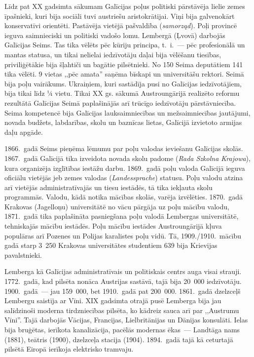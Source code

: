 \documentclass[twoside,a5paper,12pt,fleqn,openany]{extbook}
\newcommand{\pltxti}[1]{\textit{\textpolish{#1}}}
\newcommand{\detxti}[1]{\textit{\textgerman{#1}}}
\begin{document}
Līdz pat XX gadsimta sākumam Galīcijas poļus politiski pārstāvēja lielie zemes īpašnieki, kuri bija sociāli tuvi austriešu aristokrātijai. Viņi bija galvenokārt konservatīvi orientēti. Pastāvēja vietējā pašvaldība (\pltxti{samorząd}). Poļi provincē ieguva saimnieciski un politiski vadošo lomu. Lembergā (Ļvovā) darbojās Galīcijas Seims. Tas tika vēlēts pēc kūriju principa, t.~i.~--- pēc profesionālā un mantas statusa, un tikai nelielai iedzīvotāju daļai bija vēlēšanu tiesības, priviliģētākie bija šļahtiči un bagātie pilsētnieki. No 150 Seima deputātiem 141 tika vēlēti. 9 vietas ,,pēc amata'' saņēma bīskapi un universitāšu rektori. Seimā bija poļu vairākums. Ukraiņiem, kuri sastādīja pusi no Galīcijas iedzīvotājiem, bija tikai līdz ¼ vietu. Tikai XX gs. sākumā Austroungārijā realizēto reformu rezultātā Galīcijas Seimā paplašinājās arī trūcīgo iedzīvotāju pārstāvniecība. Seima kompetencē bija Galīcijas lauksaimniecības un mežsaimniecības jautājumi, novada budžets, labdarības, skolu un baznīcas lietas, Galīcijā izvietoto armijas daļu apgāde.

1866.~gadā Seims pieņēma lēmumu par poļu valodas ieviešanu Galīcijas skolās. 1867.~gadā Galīcijā tika izveidota novada skolu padome (\pltxti{Rada Szkolna Krajowa}), kura organizēja izglītības iestāžu darbu. 1869.~gadā poļu valoda Galīcijā ieguva oficiālu vietējās jeb zemes valodas (\detxti{Landessprache}) statusu. Poļu valodu atzina arī vietējās administratīvajās un tiesu iestādēs, tā tika iekļauta skolu programmās. Valodu, kādā notika mācības skolās, varēja izvēlēties. 1870.~gadā Krakovas (Jagelloņu) universitātē no vācu pārgāja uz poļu mācību valodu, 1871.~gadā tika paplašināta pasniegšana poļu valodā Lembergas universitātē, tehniskajās mācību iestādēs. Poļu mācību iestādes Austroungārijā kļuva populāras arī Pozenes un Polijas karalistes poļu vidū. Tā, 1909./1910.~mācību gadā starp 3~250 Krakovas universitātes studentiem 639 bija Krievijas pavalstnieki.

Lemberga kā Galīcijas administratīvais un politiskais centrs auga visai strauji. 1772.~gadā, kad pilsēta nonāca Austrijas sastāvā, tajā bija 20~000 iedzīvotāju. 1900.~gadā~--- jau 159~000, bet 1910.~gadā pat 200~000. 1861.~gadā dzelzceļš Lembergu saistīja ar Vīni. XIX gadsimta otrajā pusē Lemberga bija jau salīdzinoši moderna tirdzniecības pilsēta, ko kādreiz sauca arī par ,,Austrumu Vīni''. Tajā darbojās Vācijas, Francijas, Lielbritānijas un Dānijas konsulāti. Ielas bija bruģētas, ierīkota kanalizācija, pacēlās modernas ēkas~--- Landtāga nams (1881), teātris (1900), dzelzceļa stacija (1904). 1894.~gadā tajā kā ceturtajā pilsētā Eiropā ierīkoja elektrisko tramvaju.
\end{document}
